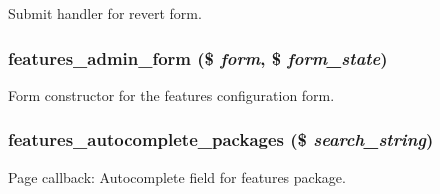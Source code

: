 \label{features_8admin_8inc_a679e838f6eeba57c2be406f1ea6fae25}
Submit handler for revert form. \hypertarget{features_8admin_8inc_a8f441a812db67e37b193c1d3e8a78142}{
\subsubsection[{features\_\-admin\_\-form}]{\setlength{\rightskip}{0pt plus 5cm}features\_\-admin\_\-form (\$ {\em form}, \/  \$ {\em form\_\-state})}}
\label{features_8admin_8inc_a8f441a812db67e37b193c1d3e8a78142}
Form constructor for the features configuration form. \hypertarget{features_8admin_8inc_a34276d58dff7308cc849f923d9fdabed}{
\subsubsection[{features\_\-autocomplete\_\-packages}]{\setlength{\rightskip}{0pt plus 5cm}features\_\-autocomplete\_\-packages (\$ {\em search\_\-string})}}
\label{features_8admin_8inc_a34276d58dff7308cc849f923d9fdabed}
Page callback: Autocomplete field for features package.


